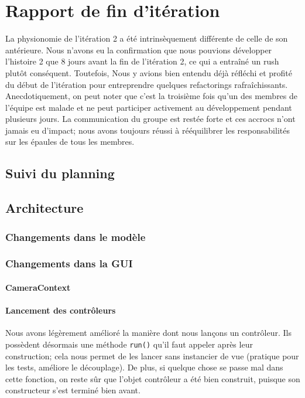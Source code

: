 \section{Rapport de fin d'itération}

La physionomie de l'itération 2 a été intrinsèquement différente de celle de son 
antérieure. Nous n'avons eu la confirmation que nous pouvions développer
l'histoire 2 que 8 jours avant la fin de l'itération 2, ce qui a entraîné un 
rush plutôt conséquent. Toutefois, Nous y avions bien entendu déjà réfléchi et 
profité du début de l'itération pour entreprendre quelques refactorings 
rafraîchissants.\\

Anecdotiquement, on peut noter que c'est la troisième fois qu'un des membres de
l'équipe est malade et ne peut participer activement au développement pendant
plusieurs jours. La communication du groupe est restée forte et ces accrocs 
n'ont jamais eu d'impact; nous avons toujours réussi à rééquilibrer les 
responsabilités sur les épaules de tous les membres.

\subsection{Suivi du planning}


\subsection{Architecture}
	
	\subsubsection{Changements dans le modèle}

	\subsubsection{Changements dans la GUI}

		\paragraph{CameraContext}

		\paragraph{Lancement des contrôleurs}
		Nous avons légèrement amélioré la manière dont nous lançons un contrôleur.
		Ils possèdent désormais une méthode \texttt{run()} qu'il faut appeler
		après leur construction; cela nous permet de les lancer sans instancier
		de vue (pratique pour les tests, améliore le découplage). De plus, si 
		quelque chose se passe mal dans cette fonction, on reste sûr que 
		l'objet contrôleur a été bien construit, puisque son constructeur s'est
		terminé bien avant. 

